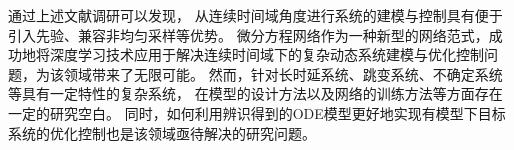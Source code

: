 通过上述文献调研可以发现，
从连续时间域角度进行系统的建模与控制具有便于引入先验、兼容非均匀采样等优势。
微分方程网络作为一种新型的网络范式，成功地将深度学习技术应用于解决连续时间域下的复杂动态系统建模与优化控制问题，为该领域带来了无限可能。
然而，针对长时延系统、跳变系统、不确定系统等具有一定特性的复杂系统，
在模型的设计方法以及网络的训练方法等方面存在一定的研究空白。
同时，如何利用辨识得到的ODE模型更好地实现有模型下目标系统的优化控制也是该领域亟待解决的研究问题。
